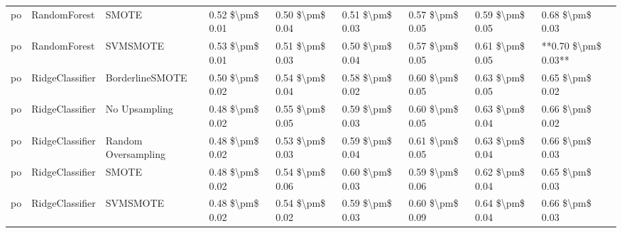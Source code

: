 \begin{tabular}{lllllllll}
      po &                    RandomForest &                         SMOTE & 0.52 \$\textbackslash pm\$ 0.01 &           0.50 \$\textbackslash pm\$ 0.04 &       0.51 \$\textbackslash pm\$ 0.03 &        0.57 \$\textbackslash pm\$ 0.05 &                         0.59 \$\textbackslash pm\$ 0.05 &     0.68 \$\textbackslash pm\$ 0.03 \\
      po &                    RandomForest &                      SVMSMOTE & 0.53 \$\textbackslash pm\$ 0.01 &           0.51 \$\textbackslash pm\$ 0.03 &       0.50 \$\textbackslash pm\$ 0.04 &        0.57 \$\textbackslash pm\$ 0.05 &                         0.61 \$\textbackslash pm\$ 0.05 & **0.70 \$\textbackslash pm\$ 0.03** \\
      po &                 RidgeClassifier &               BorderlineSMOTE & 0.50 \$\textbackslash pm\$ 0.02 &           0.54 \$\textbackslash pm\$ 0.04 &       0.58 \$\textbackslash pm\$ 0.02 &        0.60 \$\textbackslash pm\$ 0.05 &                         0.63 \$\textbackslash pm\$ 0.05 &     0.65 \$\textbackslash pm\$ 0.02 \\
      po &                 RidgeClassifier &                 No Upsampling & 0.48 \$\textbackslash pm\$ 0.02 &           0.55 \$\textbackslash pm\$ 0.05 &       0.59 \$\textbackslash pm\$ 0.03 &        0.60 \$\textbackslash pm\$ 0.05 &                         0.63 \$\textbackslash pm\$ 0.04 &     0.66 \$\textbackslash pm\$ 0.02 \\
      po &                 RidgeClassifier &           Random Oversampling & 0.48 \$\textbackslash pm\$ 0.02 &           0.53 \$\textbackslash pm\$ 0.03 &       0.59 \$\textbackslash pm\$ 0.04 &        0.61 \$\textbackslash pm\$ 0.05 &                         0.63 \$\textbackslash pm\$ 0.04 &     0.66 \$\textbackslash pm\$ 0.03 \\
      po &                 RidgeClassifier &                         SMOTE & 0.48 \$\textbackslash pm\$ 0.02 &           0.54 \$\textbackslash pm\$ 0.06 &       0.60 \$\textbackslash pm\$ 0.03 &        0.59 \$\textbackslash pm\$ 0.06 &                         0.62 \$\textbackslash pm\$ 0.04 &     0.65 \$\textbackslash pm\$ 0.03 \\
      po &                 RidgeClassifier &                      SVMSMOTE & 0.48 \$\textbackslash pm\$ 0.02 &           0.54 \$\textbackslash pm\$ 0.02 &       0.59 \$\textbackslash pm\$ 0.03 &        0.60 \$\textbackslash pm\$ 0.09 &                         0.64 \$\textbackslash pm\$ 0.04 &     0.66 \$\textbackslash pm\$ 0.03 \\

\end{tabular}
